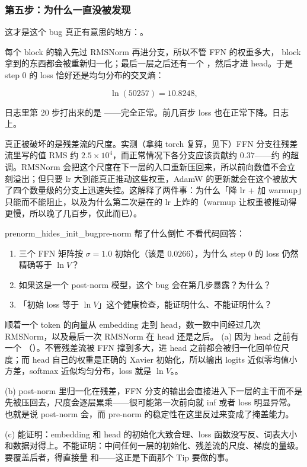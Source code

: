 \subsubsection*{第五步：为什么一直没被发现}

这才是这个 bug 真正有意思的地方：。

每个 block 的输入先过 RMSNorm 再进分支，所以不管 FFN 的权重多大， block 拿到的东西都会被重新归一化；最后一层之后还有一个 ，然后才进 head。于是 step 0 的 loss 恰好还是均匀分布的交叉熵：

\[
\ln(50257) = 10.8248 ,
\]

日志里第 20 步打出来的是 ——完全正常。前几百步 loss 也在正常下降。日志上。

真正被破坏的是残差流的尺度。实测（拿纯 torch 复算，见下）FFN 分支往残差流里写的值 RMS 约 $2.5\times10^{4}$，而正常情况下各分支应该贡献约 $0.37$——约 的超调。RMSNorm 会把这个尺度在下一层的入口重新压回来，所以前向数值不会立刻溢出；但只要 lr 大到能真正推动这些权重，AdamW 的更新就会在这个被放大了四个数量级的分支上迅速失控。这解释了两件事：为什么「降 lr + 加 warmup」只能而不能阻止，以及为什么第二次是在的 lr 上炸的（warmup 让权重被推动得更慢，所以晚了几百步，仅此而已）。

\begin{checkpoint}{prenorm_hides_init_bug}{pre-norm 帮了什么倒忙}
不看代码回答：
\begin{enumerate}[label=(\alph*)]
  \item 三个 FFN 矩阵按 $\sigma=1.0$ 初始化（该是 $0.0266$），为什么 step 0 的 loss 仍然精确等于 $\ln V$？
  \item 如果这是一个 post-norm 模型，这个 bug 会在第几步暴露？为什么？
  \item 「初始 loss 等于 $\ln V$」这个健康检查，能证明什么、不能证明什么？
\end{enumerate}
\hint 顺着一个 token 的向量从 embedding 走到 head，数一数中间经过几次 RMSNorm，以及最后一次 RMSNorm 在 head 还是之后。
\ifshowanswers
\tcblower
\answer (a) 因为 head 之前有一个 （）。不管残差流被 FFN 撑到多大，进 head 之前都会被归一化回单位尺度；而 head 自己的权重是正确的 Xavier 初始化，所以输出 logits 近似零均值小方差，softmax 近似均匀分布，loss 就是 $\ln V$。。

(b) post-norm 里归一化在残差，FFN 分支的输出会直接进入下一层的主干而不是先被压回去，尺度会逐层累乘——很可能第一次前向就 inf 或者 loss 明显异常。也就是说 post-norm 会，而 pre-norm 的稳定性在这里反过来变成了掩盖能力。

(c) 能证明：embedding 和 head 的初始化大致合理、loss 函数没写反、词表大小和数据对得上。不能证明：中间任何一层的初始化、残差流的尺度、梯度的量级。要覆盖后者，得直接量 和——这正是下面那个 Tip 要做的事。
\whereincode {}
\fi
\end{checkpoint}

